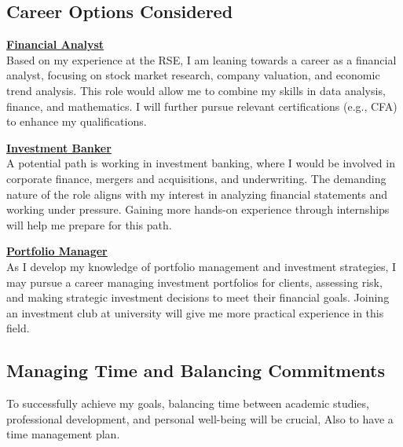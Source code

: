 \documentclass{article}
\begin{document}
\begin{titlepage}
\begin{titlepage}
\begin{flushleft}
\begin{flushleft}
\subsection{\textbf{\Large{Career Options Considered}}}
\vspace{0.2cm}

\underline{\textbf{Financial Analyst}}
\\

Based on my experience at the RSE, I am leaning towards a career as a financial analyst, focusing on stock market research, company valuation, and economic trend analysis. This role would allow me to combine my skills in data analysis, finance, and mathematics. I will further pursue relevant certifications (e.g., CFA) to enhance my qualifications.
\vspace{0.3cm}

\underline{\textbf{Investment Banker}}
\\

A potential path is working in investment banking, where I would be involved in corporate finance, mergers and acquisitions, and underwriting. The demanding nature of the role aligns with my interest in analyzing financial statements and working under pressure. Gaining more hands-on experience through internships will help me prepare for this path.
\vspace{0.3cm}

\underline{\textbf{Portfolio Manager}}
\\

As I develop my knowledge of portfolio management and investment strategies, I may pursue a career managing investment portfolios for clients, assessing risk, and making strategic investment decisions to meet their financial goals. Joining an investment club at university will give me more practical experience in this field.
\vspace{1cm}


\subsection{\Large{\textbf{Managing Time and Balancing Commitments}}}
\vspace{0.2cm}

To successfully achieve my goals, balancing time between academic studies, professional development, and personal well-being will be crucial, Also to have a time management plan.
\vspace{0.7cm}
\newpage


\end{flushleft}
\end{flushleft}
\end{titlepage}
\end{titlepage}
\end{document}
